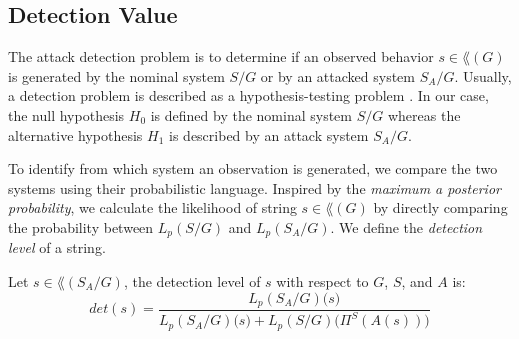 

\subsection{Detection Value}

The attack detection problem is to determine if an observed behavior $s\in \lang(G)$ is generated by the nominal system $S/G$ or by an attacked system $S_A/G$.
Usually, a detection problem is described as a hypothesis-testing problem \citep{poor2013introduction}.
In our case, the null hypothesis $H_0$ is defined by the nominal system $S/G$ whereas the alternative hypothesis $H_1$ is described by an attack system $S_A/G$.

To identify from which system an observation is generated, we compare the two systems using their probabilistic language.  
Inspired by the \emph{maximum a posterior probability}, we calculate the likelihood of string $s\in \lang(G)$ by directly comparing the probability between $L_p(S/G)$ and $L_p(S_A/G)$. 
We define the \emph{detection level} of a string.

\begin{definition}
Let $s\in \lang(S_A/G)$, the detection level of $s$ with respect to $G$, $S$, and $A$ is:
\begin{equation}\label{eq:detection_level}
det(s) = 
\frac{L_p(S_A/G)\bigl(s \bigr)}{L_p(S_A/G)\bigl(s \bigr)+L_p(S/G)\bigl(\Pi^S(A(s))\bigr)}
\end{equation}
\end{definition}

